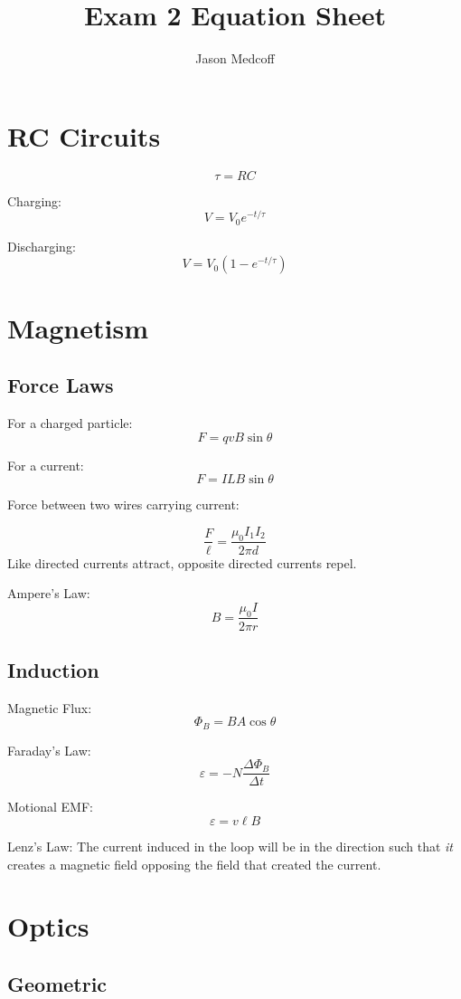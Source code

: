 \documentclass{article}
\title{Exam 2 Equation Sheet}
\author{Jason Medcoff}
\date{}
\begin{document}
	\maketitle
	
	\section{RC Circuits}
	
	$$ \tau = RC $$
	
	Charging:
	$$ V = V_0 e^{-t/\tau} $$
	
	Discharging:
	$$ V = V_0 (1-e^{-t/\tau}) $$
	
	
	\section{Magnetism}
	
	\subsection{Force Laws}
	
	For a charged particle:
	$$ F = qvB\sin\theta $$
	
	For a current:
	$$ F = ILB\sin\theta $$
	
	Force between two wires carrying current:
	
	$$ \frac{F}{\ell} = \frac{\mu_0 I_1 I_2}{2\pi d} $$
	Like directed currents attract, opposite directed currents repel.
	
	Ampere's Law:
	$$ B = \frac{\mu_0 I}{2\pi r} $$
		
	\subsection{Induction}
	
	Magnetic Flux:
	$$ \Phi_B = BA\cos\theta $$
	
	Faraday's Law:
	$$ \varepsilon = - N \frac{\Delta \Phi_B}{\Delta t} $$
	
	Motional EMF:
	$$ \varepsilon = v\ell B $$
	
	Lenz's Law:
	The current induced in the loop will be in the direction such that \textit{it} creates a magnetic field opposing the field that created the current.
	
	\section{Optics}
		
	\subsection{Geometric}
	
\end{document}
